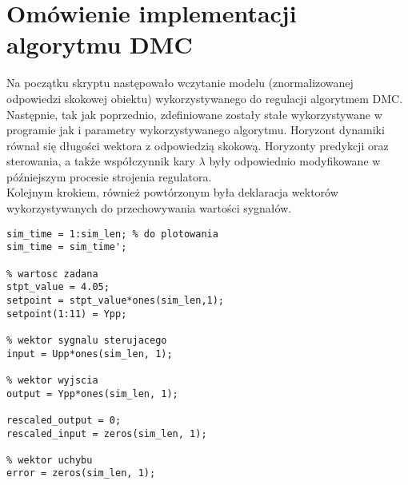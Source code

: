 

\chapter{Omówienie implementacji algorytmu DMC}
\label{zad4_lab_opis}
Na początku skryptu następowało wczytanie modelu (znormalizowanej odpowiedzi skokowej obiektu) wykorzystywanego do regulacji algorytmem DMC.\\
\indent{} Następnie, tak jak poprzednio, zdefiniowane zostały stałe wykorzystywane w programie jak i parametry wykorzystywanego algorytmu. Horyzont dynamiki równał się długości wektora z odpowiedzią skokową. Horyzonty predykcji oraz sterowania, a także współczynnik kary $\lambda$ były odpowiednio modyfikowane w późniejszym procesie strojenia regulatora. \\
\indent{} Kolejnym krokiem, również powtórzonym była deklaracja wektorów wykorzystywanych do przechowywania wartości sygnałów.

\begin{lstlisting}[style=custommatlab,frame=single,label={zad4_vecDMC_lst},caption={Inizjalizacja wektorów używanych do przechowywania sygnałów.},captionpos=b]
% czas symulacji
sim_time = 1:sim_len; % do plotowania
sim_time = sim_time';

% wartosc zadana
stpt_value = 4.05;
setpoint = stpt_value*ones(sim_len,1);
setpoint(1:11) = Ypp;

% wektor sygnalu sterujacego
input = Upp*ones(sim_len, 1);

% wektor wyjscia
output = Ypp*ones(sim_len, 1);

rescaled_output = 0;
rescaled_input = zeros(sim_len, 1);

% wektor uchybu
error = zeros(sim_len, 1);

\end{lstlisting}

